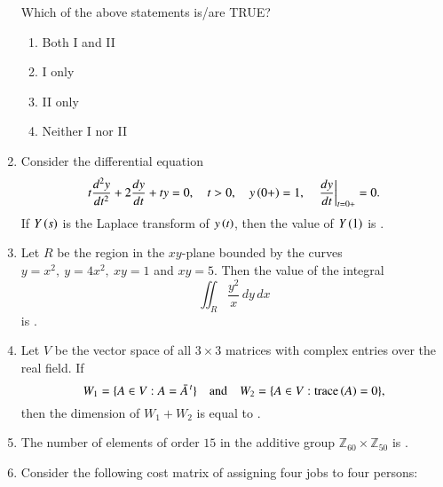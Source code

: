 \documentclass[journal,12pt,onecolumn]{IEEEtran}
\theoremstyle{remark}
\begin{document}
\begin{enumerate}[start=1, label=Q.\arabic*]
Which of the above statements is/are TRUE?
\begin{enumerate}
\item Both I and II
\item I only
\item II only
\item Neither I nor II
\end{enumerate}

\hfill{}
\item Consider the differential equation
\[
t\frac{d^{2}y}{dt^{2}} + 2\frac{dy}{dt} + t y = 0,\quad t>0,\quad y\left(0+\right)=1,\quad \left.\frac{dy}{dt}\right|_{t=0+}=0.
\]
If $Y\left(s\right)$ is the Laplace transform of $y\left(t\right)$, then the value of $Y\left(1\right)$ is \underline{\hspace{2cm}} .  

\hfill{}


\item Let $R$ be the region in the $xy$-plane bounded by the curves $y=x^{2},\ y=4x^{2},\ xy=1$ and $xy=5$. Then the value of the integral
\[
\iint_{R}\frac{y^{2}}{x}\, dy\, dx
\]
is \underline{\hspace{2cm}}.

\hfill{}


\item Let $V$ be the vector space of all $3\times 3$ matrices with complex entries over the real field. If
\[
W_{1}=\{A\in V : A=\bar{A}^{\,t}\}\quad \text{and}\quad W_{2}=\{A\in V : \text{trace}\left(A\right)=0\},
\]
then the dimension of $W_{1}+W_{2}$ is equal to \underline{\hspace{2cm}}.  

\hfill{}


\item The number of elements of order $15$ in the additive group $\mathbb{Z}_{60}\times \mathbb{Z}_{50}$ is \underline{\hspace{2cm}}.  

\hfill{}
\item Consider the following cost matrix of assigning four jobs to four persons:


\end{enumerate}
\end{document}
